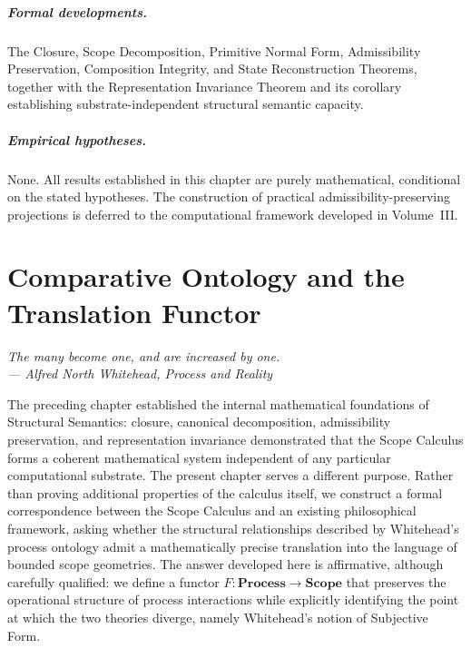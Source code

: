 \documentclass[11pt,twoside,openright]{book}
\numberwithin{equation}{chapter}
\theoremstyle{definition}
\theoremstyle{plain}
\theoremstyle{remark}
\theoremstyle{definition}
\newcommand{\CatScope}{\mathbf{Scope}}
\newcommand{\CatProcess}{\mathbf{Process}}
\begin{document}
\paragraph{Formal developments.} The Closure, Scope Decomposition,
Primitive Normal Form, Admissibility Preservation, Composition Integrity,
and State Reconstruction Theorems, together with the Representation
Invariance Theorem and its corollary establishing substrate-independent
structural semantic capacity.

\paragraph{Empirical hypotheses.} None. All results established in this
chapter are purely mathematical, conditional on the stated hypotheses.
The construction of practical admissibility-preserving projections is
deferred to the computational framework developed in Volume~III.
\chapter{Comparative Ontology and the Translation Functor}
\label{ch:translation-functor}

\vspace{1em}
\begin{flushright}\itshape
The many become one, and are increased by one.\\
\upshape --- Alfred North Whitehead, \emph{Process and Reality}
\end{flushright}
\vspace{1em}

The preceding chapter established the internal mathematical foundations
of Structural Semantics: closure, canonical decomposition, admissibility
preservation, and representation invariance demonstrated that the Scope
Calculus forms a coherent mathematical system independent of any
particular computational substrate. The present chapter serves a
different purpose. Rather than proving additional properties of the
calculus itself, we construct a formal correspondence between the Scope
Calculus and an existing philosophical framework, asking whether the
structural relationships described by Whitehead's process ontology admit
a mathematically precise translation into the language of bounded scope
geometries. The answer developed here is affirmative, although carefully
qualified: we define a functor $F:\CatProcess\to\CatScope$ that preserves
the operational structure of process interactions while explicitly
identifying the point at which the two theories diverge, namely
Whitehead's notion of Subjective Form.
\end{document}
